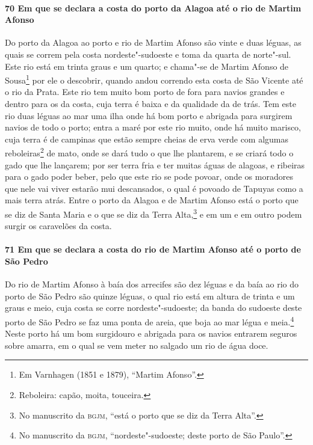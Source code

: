 \begin{linenumbers}
\paragraph{70 Em que se declara a costa do porto da Alagoa até o rio de Martim Afonso} \quad
Do porto da Alagoa ao porto e rio de Martim Afonso são vinte e duas léguas, as quais se
correm pela costa nordeste"-sudoeste e toma da quarta de norte"-sul. Este rio está em trinta
graus e um quarto; e chama"-se de Martim Afonso de Sousa\footnote{ Em Varnhagen (1851 e
1879), ``Martim Afonso''.} por ele o descobrir, quando andou correndo esta costa de São
Vicente até o rio da Prata. Este rio tem muito bom porto de fora para navios grandes e
dentro para os da costa, cuja terra é baixa e da qualidade da de trás. Tem este rio duas
léguas ao mar uma ilha onde há bom porto e abrigada para surgirem navios de todo o porto;
entra a maré por este rio muito, onde há muito marisco, cuja terra é de campinas que estão
sempre cheias de erva verde com algumas reboleiras\footnote{ Reboleira: capão, moita,
touceira.} de mato, onde se dará tudo o que lhe plantarem, e se criará todo o gado que lhe
lançarem; por ser terra fria e ter muitas águas de alagoas, e ribeiras para o gado poder
beber, pelo que este rio se pode povoar, onde os moradores que nele vai viver estarão mui
descansados, o qual é povoado de Tapuyas como a mais terra atrás. Entre o porto da Alagoa
e de Martim Afonso está o porto que se diz de Santa Maria e o que se diz da Terra
Alta,\footnote{ No manuscrito da \textsc{bgjm}, ``está o porto que se diz da Terra
Alta''.} e em um e em outro podem surgir os caravelões da costa.

\paragraph{71 Em que se declara a costa do rio de Martim Afonso até o porto de São Pedro} \quad
Do rio de Martim Afonso à baía dos arrecifes são dez léguas e da baía ao rio do porto de
São Pedro são quinze léguas, o qual rio está em altura de trinta e um graus e meio, cuja
costa se corre nordeste"-sudoeste; da banda do sudoeste deste porto de São Pedro se faz uma
ponta de areia, que boja ao mar légua e meia.\footnote{ No manuscrito da \textsc{bgjm},
``nordeste"-sudoeste; deste porto de São Paulo''.} Neste porto há um bom surgidouro e
abrigada para os navios entrarem seguros sobre amarra, em o qual se vem meter no salgado
um rio de água doce.


\end{linenumbers}
